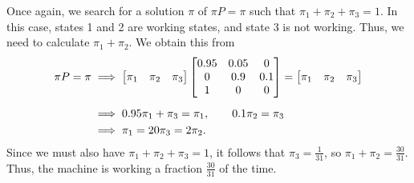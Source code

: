 \documentclass{homework}
\begin{document}
\begin{alphaparts}
		\questionpart Once again, we search for a solution $\pi$ of $\pi P = \pi$ such that $\pi_1 + \pi_2 + \pi_3 = 1$. In this case, states 1 and 2 are working states, and state 3 is not working. Thus, we need to calculate $\pi_1 + \pi_2$. We obtain this from
		\begin{align*}
			\pi P = \pi &\implies \left[\begin{matrix}\pi_1 & \pi_2 & \pi_3\end{matrix}\right] \left[\begin{matrix}0.95 & 0.05 & 0 \\ 0 & 0.9 & 0.1 \\ 1 & 0 & 0\end{matrix}\right] = \left[\begin{matrix}\pi_1 & \pi_2 & \pi_3\end{matrix}\right] \\[0.5em]
			& \implies 0.95\pi_1 + \pi_3 = \pi_1, \qquad 0.1\pi_2 = \pi_3 \\
			& \implies \pi_1 = 20\pi_3 = 2\pi_2.
		\end{align*}
		Since we must also have $\pi_1 +\pi_2 + \pi_3 = 1$, it follows that $\pi_3 = \frac{1}{31}$, so $\pi_1 + \pi_2 = \frac{30}{31}$. Thus, the machine is working a fraction $\frac{30}{31}$ of the time.
	\end{alphaparts}
	
\end{document}
